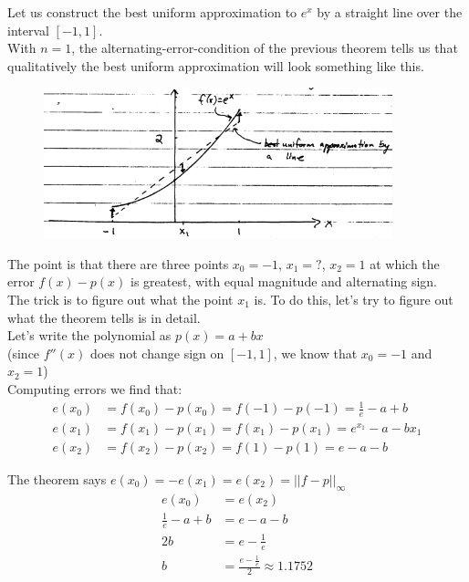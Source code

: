 {Let us construct the best uniform approximation to $e^x$ by a straight line over the interval $[-1, 1]$. \\

With $n=1$, the alternating-error-condition of the previous theorem tells us that qualitatively the best uniform approximation will look something like this.

\begin{figure}[H]
    \centering
    \includegraphics[width=0.9\textwidth]{figures/approximation_1}
    \label{fig:approximation-1}
\end{figure}

The point is that there are three points $x_0 = -1$, $x_1 = ?$, $x_2 = 1$ at which the error $f(x) - p(x)$ is greatest, with equal magnitude and alternating sign. \\

The trick is to figure out what the point $x_1$ is. To do this, let's try to figure out what the theorem tells is in detail. \\

Let's write the polynomial as $p(x) = a + bx$ \\

(since $f''(x)$ does not change sign on $[-1, 1]$, we know that $x_0 = -1$ and $x_2 = 1$) \\

Computing errors we find that:
\begin{align*}
    e(x_0) &= f(x_0) - p(x_0) = f(-1) - p(-1) = \frac{1}{e} - a + b\\
    e(x_1) &= f(x_1) - p(x_1) = f(x_1) - p(x_1) = e^{x_1} - a - bx_1\\
    e(x_2) &= f(x_2) - p(x_2) = f(1) - p(1) = e - a - b
\end{align*}

The theorem says $e(x_0) = - e(x_1) = e(x_2) = ||f - p||_\infty$
\begin{align*}
    e(x_0) &= e(x_2) \\
    \frac{1}{e} - a + b &= e - a - b \\
    2b &= e - \frac{1}{e} \\
    b &= \frac{e - \frac{1}{e}}{2} \approx 1.1752
\end{align*}

}
